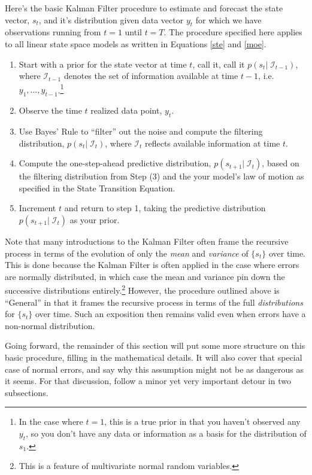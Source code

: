 \documentclass[a4paper,12pt]{article}
\begin{document}
Here's the basic Kalman Filter procedure to estimate and forecast the state vector, $s_t$, and it's distribution given data vector $y_t$ for which we have observations running from $t=1$ until $t=T$. The procedure specified here applies to all linear state space models as written in Equations \ref{ste} and \ref{moe}.
\begin{enumerate}
\item Start with a prior for the state vector at time $t$, call it, call it $p(s_t |\; \mathcal{I}_{t-1})$, where $\mathcal{I}_{t-1}$ denotes the set of information available at time $t-1$, i.e. $y_1, \ldots, y_{t-1}$.\footnote{In the case where $t=1$, this is a true prior in that you haven't observed any $y_t$, so you don't have any data or information as a basis for the distribution of $s_1$.}
\item Observe the time $t$ realized data point, $y_t$. 
\item Use Bayes' Rule to ``filter'' out the noise and compute the filtering distribution, $p(s_t |\; \mathcal{I}_{t})$, where $\mathcal{I}_{t}$ reflects available information at time $t$.
\item Compute the one-step-ahead predictive distribution, $p(s_{t+1} | \; \mathcal{I}_{t})$, based on the filtering distribution from Step (3) and the your model's law of motion as specified in the State Transition Equation.  
\item Increment $t$ and return to step 1, taking
the predictive distribution $p(s_{t+1} |\; \mathcal{I}_{t})$ as your prior.
\end{enumerate} 
Note that many introductions to the Kalman Filter often frame the recursive process in terms of the evolution of only the \emph{mean} and \emph{variance} of $\{s_t\}$ over time. This is done because the Kalman Filter is often applied in the case where errors are normally distributed, in which case the mean and variance pin down the successive distributions {entirely}.\footnote{This is a feature of multivariate normal random variables.} However, the procedure outlined above is ``General'' in that it frames the recursive process in terms of the full \emph{distributions} for $\{s_t\}$ over time. Such an exposition then remains valid even when errors have a non-normal distribution.

Going forward, the remainder of this section will put some more structure on this basic procedure, filling in the mathematical details. It will also cover that special case of normal errors, and say why this assumption might not be as dangerous as it seems. For that discussion, follow a minor yet very important detour in two subsections.
\end{document}
